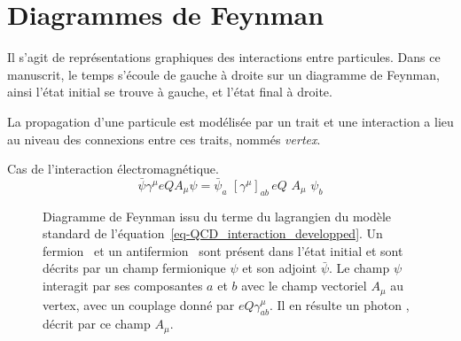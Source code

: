 \chapter{Diagrammes de Feynman}\label{annexe-fmf}

Il s'agit de représentations graphiques des interactions entre particules. Dans ce manuscrit, le temps s'écoule de gauche à droite sur un diagramme de Feynman, ainsi l'état initial se trouve à gauche, et l'état final à droite.

La propagation d'une particule est modélisée par un trait et une interaction a lieu au niveau des connexions entre ces traits, nommés \emph{vertex}.


Cas de l'interaction électromagnétique.
\begin{equation}
\bar{\psi}\gamma^\mu eQA_\mu \psi
=
\bar{\psi}_a \,\, [\gamma^\mu]_{ab} \, eQ \,\, A_\mu \,\, \psi_b
\label{eq-QCD_interaction_developped}
\end{equation}
\begin{figure}[h]
\centering
\vspace{\baselineskip}

\vspace{\baselineskip}
\caption{Diagramme de Feynman issu du terme du lagrangien du modèle standard de l'équation~\eqref{eq-QCD_interaction_developped}. Un fermion \fermion\ et un antifermion \antifermion\ sont présent dans l'état initial et sont décrits par un champ fermionique $\psi$ et son adjoint $\bar{\psi}$. Le champ $\psi$ interagit par ses composantes $a$ et $b$ avec le champ vectoriel $A_\mu$ au vertex, avec un couplage donné par $eQ\gamma^\mu_{ab}$. Il en résulte un photon \photon, décrit par ce champ $A_\mu$.}
\label{fig-fgraph-ff_Gamma1-large-annexeB}
\end{figure}